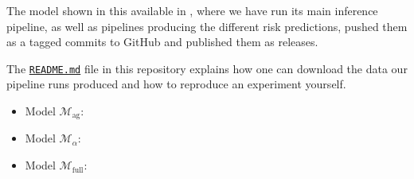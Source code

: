 \begin{tcolorbox}[
    title=\faIcon{recycle} Reproducibility,
    parbox=false,
    float
]
    The model shown in this available in , where we have run its main inference pipeline, as well as pipelines producing the different risk predictions, pushed them as a tagged commits to GitHub and published them as releases.

    The \href{https://github.com/rmnldwg/lynference#readme}{ \texttt{README.md}} file in this repository explains how one can download the data our pipeline runs produced and how to reproduce an experiment yourself.

    \begin{itemize}
        \item Model $\mathcal{M}_\text{ag}$: 
        \item Model $\mathcal{M}_\alpha$: 
        \item Model $\mathcal{M}_\text{full}$: 
    \end{itemize}
\end{tcolorbox}
